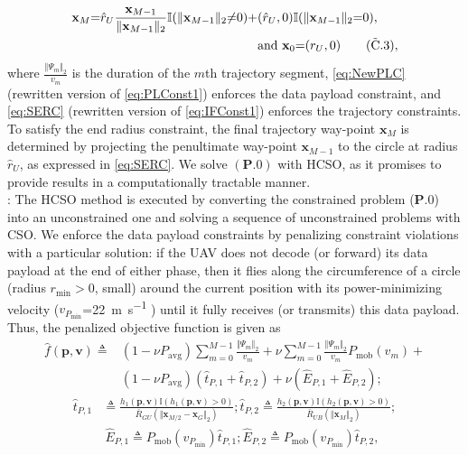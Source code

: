 \documentclass[10pt, twocolumn]{IEEEtran}
\theoremstyle{plain}
\theoremstyle{definition}
\theoremstyle{remark}
\begin{document}
\begin{align}
    \mathbf{x}_{M}{=}\hat{r}_{U}\frac{\mathbf{x}_{M{-}1}}{\Vert\mathbf{x}_{M{-}1}\Vert_{2}}\mathbb{I}(\Vert\mathbf{x}_{M{-}1}\Vert_{2}{\neq} 0){+}&(\hat{r}_{U},0)\mathbb{I}(\Vert\mathbf{x}_{M{-}1}\Vert_{2}{=}0),\nonumber\\
    &\text{and }\mathbf{x}_{0}{=}(r_{U},0)\label{eq:SERC}\tag{$\tilde{\text{C}}$.3},
\end{align}
where
$\frac{\Vert\Psi_{m}\Vert_{2}}{v_{m}}$ is the duration of the $m$th trajectory segment,
\ref{eq:NewPLC} (rewritten version of \ref{eq:PLConst1}) enforces the data payload constraint, and \ref{eq:SERC} (rewritten version of \ref{eq:IFConst1}) enforces the trajectory constraints. To satisfy the end radius constraint, the final trajectory way-point $\mathbf{x}_{M}$ is determined by projecting the penultimate way-point $\mathbf{x}_{M{-}1}$ to the circle at radius $\hat{r}_{U}$, as expressed in \ref{eq:SERC}. We solve $(\mathbf{P.0})$ with HCSO, as it promises to provide results in a computationally tractable manner.\\
: The HCSO method is executed by converting the constrained problem ($\mathbf{P.0}$) into an unconstrained one and solving a sequence of unconstrained problems with CSO. We enforce the data payload constraints by penalizing constraint violations with a particular solution: if the UAV does not {decode} (or {forward}) its data payload at the end of either phase, then it flies along the circumference of a circle (radius $r_{\mathrm{min}}{>}0$, small) around the current position with its power-minimizing velocity ($v_{P_{\mathrm{min}}}$=\qty[mode=text]{22}{\meter\per\second} \cite{SCA}) until it fully receives (or transmits) this data payload. Thus, the penalized objective function is given as
\begin{align}
    \hat{f}(\mathbf{p},\mathbf{v}){\triangleq}&(1{-}\nu P_{\mathrm{avg}})\sum_{m{=}0}^{M{-}1}\frac{\Vert\Psi_{m}\Vert_{2}}{v_{m}}{+}\nu \sum_{m{=}0}^{M{-}1}\frac{\Vert\Psi_{m}\Vert_{2}}{v_{m}}P_{\mathrm{mob}}(v_{m}){+}\nonumber\\&(1{-}\nu P_{\mathrm{avg}})(\hat{t}_{P,1}{+}\hat{t}_{P,2}){+}\nu(\hat{E}_{P,1}{+}\hat{E}_{P,2});
\end{align}
\begin{align}
    \hat{t}_{P,1}&{\triangleq}\frac{h_{1}(\mathbf{p},\mathbf{v})\mathbb{I}\left(h_{1}(\mathbf{p},\mathbf{v}){>}0\right)}{\bar{R}_{GU}\left(\Vert\mathbf{x}_{M/2}-\mathbf{x}_{G}\Vert_{2}\right)};\hat{t}_{P,2}{\triangleq}\frac{h_{2}(\mathbf{p},\mathbf{v})\mathbb{I}(h_{2}(\mathbf{p},\mathbf{v}){>}0)}{\bar{R}_{UB}\left(\Vert\mathbf{x}_{M}\Vert_{2}\right)};\nonumber\\
    &\ \hat{E}_{P,1}{\triangleq}P_{\mathrm{mob}}(v_{P_{\mathrm{min}}})\hat{t}_{P,1};\hat{E}_{P,2}{\triangleq}P_{\mathrm{mob}}(v_{P_{\mathrm{min}}})\hat{t}_{P,2},
\end{align}
\end{document}
